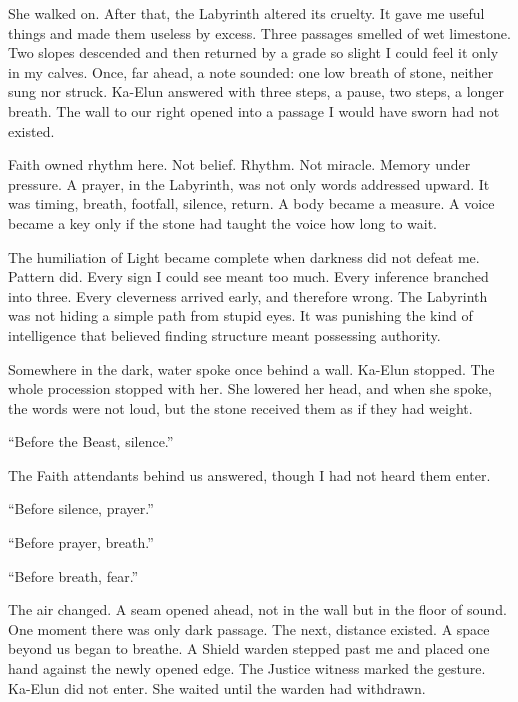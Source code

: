She walked on. After that, the Labyrinth altered its cruelty. It gave me useful things and made them useless by excess. Three passages smelled of wet limestone. Two slopes descended and then returned by a grade so slight I could feel it only in my calves. Once, far ahead, a note sounded: one low breath of stone, neither sung nor struck. Ka-Elun answered with three steps, a pause, two steps, a longer breath. The wall to our right opened into a passage I would have sworn had not existed.\par

Faith owned rhythm here. Not belief. Rhythm. Not miracle. Memory under pressure. A prayer, in the Labyrinth, was not only words addressed upward. It was timing, breath, footfall, silence, return. A body became a measure. A voice became a key only if the stone had taught the voice how long to wait.\par

The humiliation of Light became complete when darkness did not defeat me. Pattern did. Every sign I could see meant too much. Every inference branched into three. Every cleverness arrived early, and therefore wrong. The Labyrinth was not hiding a simple path from stupid eyes. It was punishing the kind of intelligence that believed finding structure meant possessing authority.\par

Somewhere in the dark, water spoke once behind a wall. Ka-Elun stopped. The whole procession stopped with her. She lowered her head, and when she spoke, the words were not loud, but the stone received them as if they had weight.\par

``Before the Beast, silence.''\par

The Faith attendants behind us answered, though I had not heard them enter.\par

``Before silence, prayer.''\par

``Before prayer, breath.''\par

``Before breath, fear.''\par

The air changed. A seam opened ahead, not in the wall but in the floor of sound. One moment there was only dark passage. The next, distance existed. A space beyond us began to breathe. A Shield warden stepped past me and placed one hand against the newly opened edge. The Justice witness marked the gesture. Ka-Elun did not enter. She waited until the warden had withdrawn.\par

